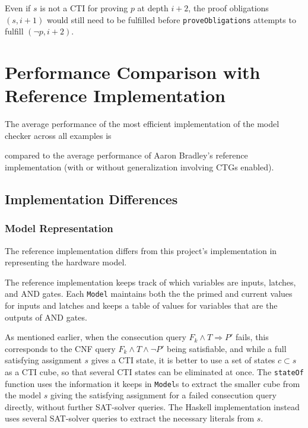 \documentclass[12pt,a4paper,twoside,openright]{report}
\begin{document}
{Even if $s$ is not a CTI for proving $p$ at depth $i + 2$, the proof obligations $(s, i+1)$ would still need to
be fulfilled before \verb,proveObligations, attempts to fulfill $(\neg p, i + 2)$.

\section{Performance Comparison with Reference Implementation}

The average performance of the most efficient implementation of the model checker across all examples is

compared to the average performance of Aaron Bradley's reference implementation (with or without generalization
involving CTGs enabled).

\subsection{Implementation Differences}

\subsubsection{Model Representation}
The reference implementation differs from this project's implementation in representing the hardware model.

The reference implementation keeps track of which variables are inputs, latches, and AND gates.
Each \verb,Model, maintains both the the primed and current values for inputs and latches and keeps a
table of values for variables that are the outputs of AND gates.


As mentioned earlier, when the consecution query $F_k \wedge T \Rightarrow P'$ fails, this corresponds
to the CNF query $F_k \wedge T \wedge \neg P'$ being satisfiable, and while a full satisfying assignment
$s$ gives a CTI state, it is better to use a set of states $c \subset s$ as a CTI cube, so that several
CTI states can be eliminated at once.
The \verb,stateOf, function uses the information it keeps in \verb,Model,s to extract the smaller
cube from the model $s$ giving the satisfying assignment for a failed consecution query directly,
without further SAT-solver queries.
The Haskell implementation instead uses several SAT-solver queries to extract the necessary literals
from $s$.


}
\end{document}
